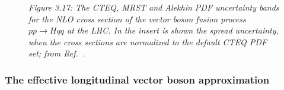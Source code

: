 \begin{figure}[h!]
\begin{center}
\vspace*{-2.6cm}
\hspace*{-2cm}
\end{center}
\vspace*{-14.8cm}
{\it Figure 3.17: The CTEQ, MRST and Alekhin PDF uncertainty bands for the NLO
cross section of the vector boson fusion process $pp\to Hqq$ at the LHC. In the
insert is shown the spread uncertainty, when the cross sections are normalized
to the default CTEQ PDF set; from Ref.~\cite{Samir}.}
\vspace*{-1mm} 
\end{figure}

\subsubsection{The effective longitudinal vector boson approximation}

